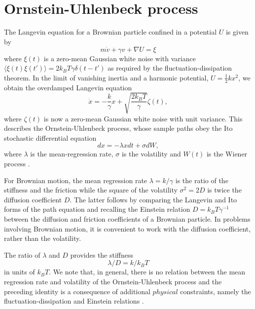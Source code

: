 \documentclass[english,aps, twocolumn, pre,superscriptaddress]{revtex4-1}
\begin{document}
\section{Ornstein-Uhlenbeck process\label{sec:Ornstein-Uhlenbeck-process}}

The Langevin equation for a Brownian particle confined in a potential
$U$ is given by 
\begin{equation}
m\dot{v}+\gamma v+\nabla U=\xi
\end{equation}
where $\xi(t)$ is a zero-mean Gaussian white noise with variance
$\langle\xi(t)\xi(t')\rangle=2k_{B}T\gamma\delta(t-t')$ as required
by the fluctuation-dissipation theorem. In the limit of vanishing
inertia and a harmonic potential, $U=\frac{{1}}{2}kx^{2}$, we obtain
the overdamped Langevin equation 
\begin{equation}
\dot{x}=-\frac{k}{\gamma}x+\sqrt{\frac{2k_{B}T}{\gamma}}\zeta(t),
\end{equation}
where $\zeta(t)$ is now a zero-mean Gaussian white noise with unit
variance. This describes the Ornstein-Uhlenbeck process, whose sample
paths obey the Ito stochastic differential equation 
\begin{equation}
dx=-\lambda xdt+\sigma dW,
\end{equation}
where $\lambda$ is the mean-regression rate, $\sigma$ is the volatility
and $W(t)$ is the Wiener process \cite{gardiner1985handbook}. 

For Brownian motion, the mean regression rate $\lambda=k/\gamma$
is the ratio of the stiffness and the friction while the square of
the volatility $\sigma^{2}=2D$ is twice the diffusion coefficient
$D$. The latter follows by comparing the Langevin and Ito forms of
the path equation and recalling the Einstein relation $D=k_{B}T\gamma^{-1}$
between the diffusion and friction coefficients of a Brownian particle.
In problems involving Brownian motion, it is convenient to work with
the diffusion coefficient, rather than the volatility. 

The ratio of $\lambda$ and $D$ provides the stiffness 
\begin{equation}
\lambda/D=k/k_{B}T
\end{equation}
in units of $k_{B}T$. We note that, in general, there is no relation
between the mean regression rate and volatility of the Ornstein-Uhlenbeck
process and the preceding identity is a consequence of additional
$physical$ constraints, namely the fluctuation-dissipation and Einstein
relations \cite{kubo1966fluctuation}. 
\end{document}
